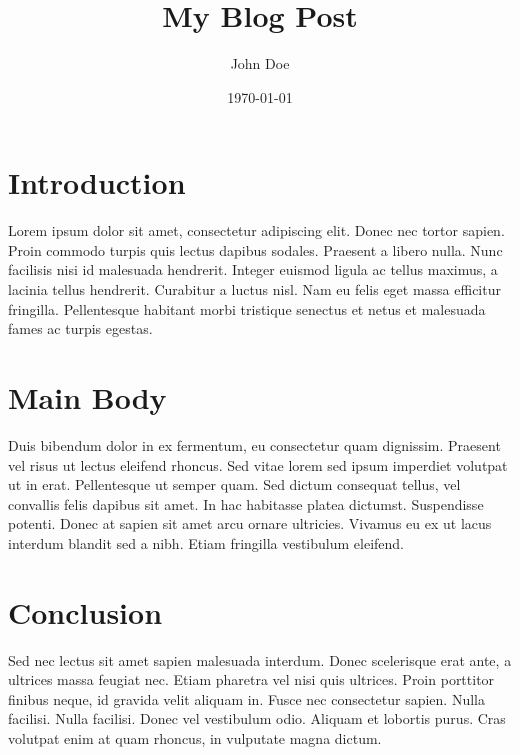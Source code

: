 \documentclass{article}
\title{My Blog Post} \author{John Doe} \date{\today}
\begin{document}
\maketitle

\section{Introduction}

Lorem ipsum dolor sit amet, consectetur adipiscing elit. Donec nec tortor sapien. Proin commodo turpis quis lectus dapibus sodales. Praesent a libero nulla. Nunc facilisis nisi id malesuada hendrerit. Integer euismod ligula ac tellus maximus, a lacinia tellus hendrerit. Curabitur a luctus nisl. Nam eu felis eget massa efficitur fringilla. Pellentesque habitant morbi tristique senectus et netus et malesuada fames ac turpis egestas.

\section{Main Body}

Duis bibendum dolor in ex fermentum, eu consectetur quam dignissim. Praesent vel risus ut lectus eleifend rhoncus. Sed vitae lorem sed ipsum imperdiet volutpat ut in erat. Pellentesque ut semper quam. Sed dictum consequat tellus, vel convallis felis dapibus sit amet. In hac habitasse platea dictumst. Suspendisse potenti. Donec at sapien sit amet arcu ornare ultricies. Vivamus eu ex ut lacus interdum blandit sed a nibh. Etiam fringilla vestibulum eleifend.

\section{Conclusion}

Sed nec lectus sit amet sapien malesuada interdum. Donec scelerisque erat ante, a ultrices massa feugiat nec. Etiam pharetra vel nisi quis ultrices. Proin porttitor finibus neque, id gravida velit aliquam in. Fusce nec consectetur sapien. Nulla facilisi. Nulla facilisi. Donec vel vestibulum odio. Aliquam et lobortis purus. Cras volutpat enim at quam rhoncus, in vulputate magna dictum.
\end{document}
